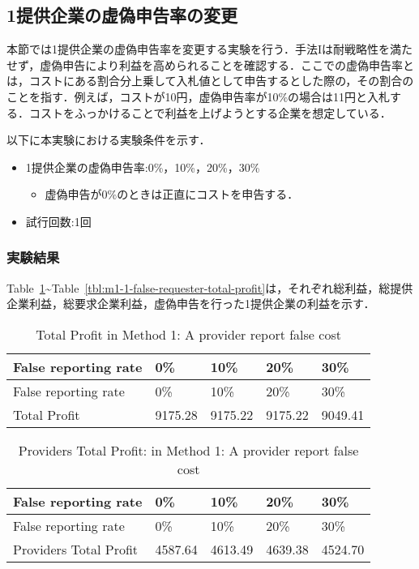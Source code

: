 \hypertarget{ux63d0ux4f9bux4f01ux696dux306eux865aux507dux7533ux544aux7387ux306eux5909ux66f4}{%
\subsection{1提供企業の虚偽申告率の変更}\label{ux63d0ux4f9bux4f01ux696dux306eux865aux507dux7533ux544aux7387ux306eux5909ux66f4}}

本節では1提供企業の虚偽申告率を変更する実験を行う．手法Iは耐戦略性を満たせず，虚偽申告により利益を高められることを確認する．ここでの虚偽申告率とは，コストにある割合分上乗して入札値として申告するとした際の，その割合のことを指す．例えば，コストが10円，虚偽申告率が10\%の場合は11円と入札する．コストをふっかけることで利益を上げようとする企業を想定している．

以下に本実験における実験条件を示す．

\begin{itemize}
\tightlist
\item
  1提供企業の虚偽申告率:0\%，10\%，20\%，30\%

  \begin{itemize}
  \tightlist
  \item
    虚偽申告が0\%のときは正直にコストを申告する．
  \end{itemize}
\item
  試行回数:1回
\end{itemize}

\hypertarget{ux5b9fux9a13ux7d50ux679c}{%
\subsubsection{実験結果}\label{ux5b9fux9a13ux7d50ux679c}}

Table~\ref{tbl:m1-1-total-profit}\textasciitilde{}Table~\ref{tbl:m1-1-false-requester-total-profit}は，それぞれ総利益，総提供企業利益，総要求企業利益，虚偽申告を行った1提供企業の利益を示す．

\hypertarget{tbl:m1-1-total-profit}{}
\begin{longtable}[H]{@{}lllll@{}}
\caption{\label{tbl:m1-1-total-profit}Total Profit in Method 1: A
provider report false cost}\tabularnewline
\toprule
False reporting rate & 0\% & 10\% & 20\% & 30\%\tabularnewline
\midrule
\endfirsthead
\toprule
False reporting rate & 0\% & 10\% & 20\% & 30\%\tabularnewline
\midrule
\endhead
Total Profit & 9175.28 & 9175.22 & 9175.22 & 9049.41\tabularnewline
\bottomrule
\end{longtable}

\hypertarget{tbl:m1-1-providers-total-profit}{}
\begin{longtable}[H]{@{}lllll@{}}
\caption{\label{tbl:m1-1-providers-total-profit}Providers Total Profit:
in Method 1: A provider report false cost}\tabularnewline
\toprule
False reporting rate & 0\% & 10\% & 20\% & 30\%\tabularnewline
\midrule
\endfirsthead
\toprule
False reporting rate & 0\% & 10\% & 20\% & 30\%\tabularnewline
\midrule
\endhead
Providers Total Profit & 4587.64 & 4613.49 & 4639.38 &
4524.70\tabularnewline
\bottomrule
\end{longtable}

